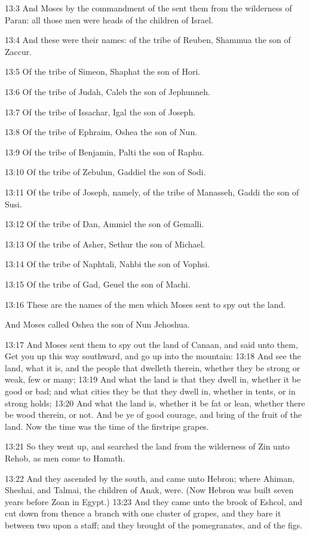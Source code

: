 13:3 And Moses by the commandment of the \LORD sent them from the
wilderness of Paran: all those men were heads of the children of
Israel.

13:4 And these were their names: of the tribe of Reuben, Shammua the
son of Zaccur.

13:5 Of the tribe of Simeon, Shaphat the son of Hori.

13:6 Of the tribe of Judah, Caleb the son of Jephunneh.

13:7 Of the tribe of Issachar, Igal the son of Joseph.

13:8 Of the tribe of Ephraim, Oshea the son of Nun.

13:9 Of the tribe of Benjamin, Palti the son of Raphu.

13:10 Of the tribe of Zebulun, Gaddiel the son of Sodi.

13:11 Of the tribe of Joseph, namely, of the tribe of Manasseh, Gaddi
the son of Susi.

13:12 Of the tribe of Dan, Ammiel the son of Gemalli.

13:13 Of the tribe of Asher, Sethur the son of Michael.

13:14 Of the tribe of Naphtali, Nahbi the son of Vophsi.

13:15 Of the tribe of Gad, Geuel the son of Machi.

13:16 These are the names of the men which Moses sent to spy out the
land.

And Moses called Oshea the son of Nun Jehoshua.

13:17 And Moses sent them to spy out the land of Canaan, and said unto
them, Get you up this way southward, and go up into the mountain:
13:18 And see the land, what it is, and the people that dwelleth
therein, whether they be strong or weak, few or many; 13:19 And what
the land is that they dwell in, whether it be good or bad; and what
cities they be that they dwell in, whether in tents, or in strong
holds; 13:20 And what the land is, whether it be fat or lean, whether
there be wood therein, or not. And be ye of good courage, and bring of
the fruit of the land. Now the time was the time of the firstripe
grapes.

13:21 So they went up, and searched the land from the wilderness of
Zin unto Rehob, as men come to Hamath.

13:22 And they ascended by the south, and came unto Hebron; where
Ahiman, Sheshai, and Talmai, the children of Anak, were. (Now Hebron
was built seven years before Zoan in Egypt.)  13:23 And they came unto
the brook of Eshcol, and cut down from thence a branch with one
cluster of grapes, and they bare it between two upon a staff; and they
brought of the pomegranates, and of the figs.

